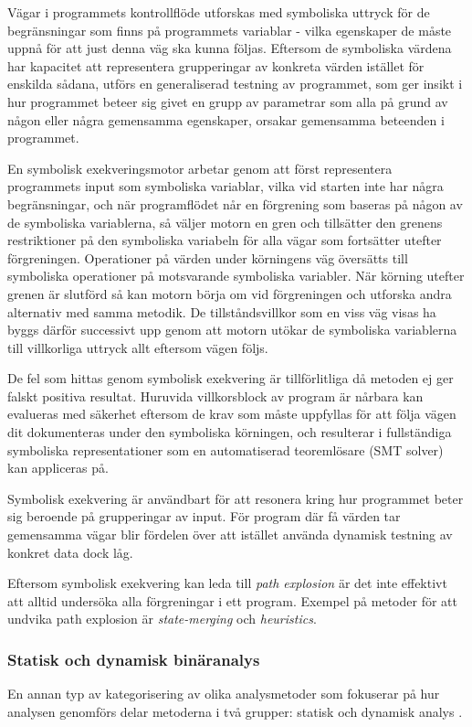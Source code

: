 Vägar i programmets kontrollflöde utforskas med symboliska uttryck för de 
begränsningar som finns på programmets variablar - vilka egenskaper de måste uppnå 
för att just denna väg ska kunna följas. Eftersom de symboliska värdena har kapacitet 
att representera grupperingar av konkreta värden istället för enskilda sådana, 
utförs en generaliserad testning av programmet, som ger insikt i hur programmet 
beteer sig givet en grupp av parametrar som alla på grund av någon eller några 
gemensamma egenskaper, orsakar gemensamma beteenden i programmet. 

En symbolisk exekveringsmotor arbetar genom att först representera programmets input 
som symboliska variablar, vilka vid starten inte har några begränsningar, och när 
programflödet når en förgrening som baseras på någon av de symboliska variablerna, 
så väljer motorn en gren och tillsätter den grenens restriktioner på den symboliska 
variabeln för alla vägar som fortsätter utefter förgreningen. Operationer på värden 
under körningens väg översätts till symboliska operationer på motsvarande symboliska 
variabler. \cite{klee} När körning utefter grenen är slutförd så kan motorn börja om 
vid förgreningen och utforska andra alternativ med samma metodik. De tillståndsvillkor 
som en viss väg visas ha byggs därför successivt upp genom att motorn utökar de 
symboliska variablerna till villkorliga uttryck allt eftersom vägen följs. 

De fel som hittas genom symbolisk exekvering är tillförlitliga då metoden ej ger falskt 
positiva resultat. Huruvida villkorsblock av program är nårbara kan evalueras med 
säkerhet eftersom de krav som måste uppfyllas för att följa vägen dit dokumenteras under 
den symboliska körningen, och resulterar i fullständiga symboliska representationer 
som en automatiserad teoremlösare (SMT solver) kan appliceras på. 

Symbolisk exekvering är användbart för att resonera kring hur programmet beter sig 
beroende på grupperingar av input. För program där få värden tar gemensamma vägar blir 
fördelen över att istället använda dynamisk testning av konkret data dock låg. 

Eftersom symbolisk exekvering kan leda till \emph{path explosion} är det inte effektivt 
att alltid undersöka alla förgreningar i ett program. Exempel på metoder för att undvika 
path explosion är \emph{state-merging} och \emph{heuristics}. 

\subsubsection{Statisk och dynamisk binäranalys}
En annan typ av kategorisering av olika analysmetoder som fokuserar på hur
analysen genomförs delar metoderna i två grupper: statisk och dynamisk analys
\cite{dynamic_bin_analysis}.

